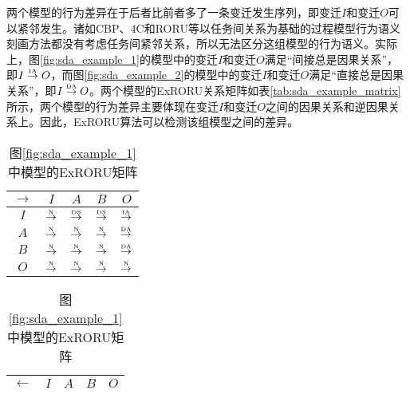 两个模型的行为差异在于后者比前者多了一条变迁发生序列，即变迁$I$和变迁$O$可以紧邻发生。诸如CBP、4C和RORU等以任务间关系为基础的过程模型行为语义刻画方法都没有考虑任务间紧邻关系，所以无法区分这组模型的行为语义。实际上，图\ref{fig:sda_example_1}的模型中的变迁$I$和变迁$O$满足“间接总是因果关系”，即$I\overset{\text{\tiny{IA}}}{\rightarrow}O$，而图\ref{fig:sda_example_2}的模型中的变迁$I$和变迁$O$满足“直接总是因果关系”，即$I\overset{\text{\tiny{DA}}}{\rightarrow}O$。两个模型的ExRORU关系矩阵如表\ref{tab:sda_example_matrix}所示，两个模型的行为差异主要体现在变迁$I$和变迁$O$之间的因果关系和逆因果关系上。因此，ExRORU算法可以检测该组模型之间的差异。

\begin{table}[htbp]
  \centering
  \caption{图\ref{fig:sda_example}中两个模型的ExRORU矩阵}
  \label{tab:sda_example_matrix}
  \begin{subtable}{1\textwidth}
    \centering
    \caption{图\ref{fig:sda_example_1}中模型的ExRORU矩阵}
    \label{tab:sda_example_1_matrix}
    \begin{minipage}[b]{0.3\textwidth}
      \centering
      \begin{tabular}{|c|c|c|c|c|} \hline
        $\rightarrow$ & $I$ & $A$ & $B$ & $O$\\ \hline
        $I$ & $\overset{\text{\tiny{N}}}{\rightarrow}$ & $\overset{\text{\tiny{DS}}}{\rightarrow}$ & $\overset{\text{\tiny{DS}}}{\rightarrow}$ & $\overset{\text{\tiny{IA}}}{\rightarrow}$\\ \hline
        $A$ & $\overset{\text{\tiny{N}}}{\rightarrow}$ & $\overset{\text{\tiny{N}}}{\rightarrow}$ & $\overset{\text{\tiny{N}}}{\rightarrow}$ & $\overset{\text{\tiny{DA}}}{\rightarrow}$\\ \hline
        $B$ & $\overset{\text{\tiny{N}}}{\rightarrow}$ & $\overset{\text{\tiny{N}}}{\rightarrow}$ & $\overset{\text{\tiny{N}}}{\rightarrow}$ & $\overset{\text{\tiny{DA}}}{\rightarrow}$\\ \hline
        $O$ & $\overset{\text{\tiny{N}}}{\rightarrow}$ & $\overset{\text{\tiny{N}}}{\rightarrow}$ & $\overset{\text{\tiny{N}}}{\rightarrow}$ & $\overset{\text{\tiny{N}}}{\rightarrow}$\\ \hline
      \end{tabular}
    \end{minipage}
    \begin{minipage}[b]{0.3\textwidth}
      \centering
      \begin{tabular}{|c|c|c|c|c|} \hline
        $\leftarrow$ & $I$ & $A$ & $B$ & $O$\\ \hline

\end{tabular}
\end{minipage}
\end{subtable}
\end{table}
